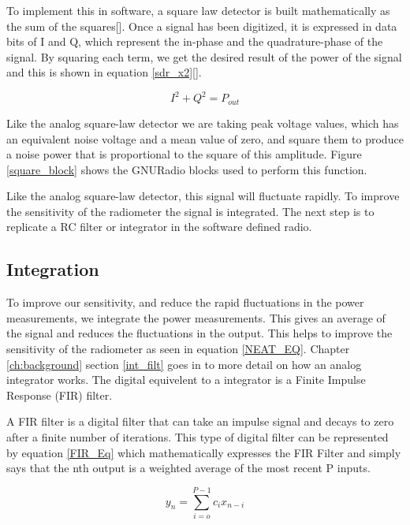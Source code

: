 To implement this in software, a square law detector is built mathematically as the sum of the squares[\cite{Sarijari}].  Once a signal has been digitized, it is expressed in data bits of I and Q, which represent the in-phase and the quadrature-phase of the signal.  By squaring each term, we get the desired result of the power of the signal and this is shown in equation \ref{sdr_x2}[\cite{Rashid}].

\begin{equation}\label{sdr_x2}
I^2+Q^2 = P_{out}
\end{equation}

Like the analog square-law detector we are taking peak voltage values, which has an equivalent noise voltage and a mean value of zero, and square them to produce a noise power that is proportional to the square of this amplitude.  Figure \ref{square_block} shows the GNURadio blocks used to perform this function.

Like the analog square-law detector, this signal will fluctuate rapidly.  To improve the sensitivity of the radiometer the signal is integrated.  The next step is to replicate a RC filter or integrator in the software defined radio.

\subsection{Integration}

To improve our sensitivity, and reduce the rapid fluctuations in the power measurements, we integrate the power measurements.  This gives an average of the signal and reduces the fluctuations in the output.  This helps to improve the sensitivity of the radiometer as seen in equation \ref{NEAT_EQ}.  Chapter \ref{ch:background} section \ref{int_filt} goes in to more detail on how an analog integrator works.  The digital equivelent to a integrator is a Finite Impulse Response (FIR) filter.

A FIR filter is a digital filter that can take an impulse signal and decays to zero after a finite number of iterations.  This type of digital filter can be represented by equation \ref{FIR_Eq} which mathematically expresses the FIR Filter and simply says that the nth output is a weighted average of the most recent P inputs. 

\begin{equation}\label{FIR_Eq}
y_n=\displaystyle\sum\limits_{i=o}^{P-1} c_ix_{n-i}
\end{equation} 

